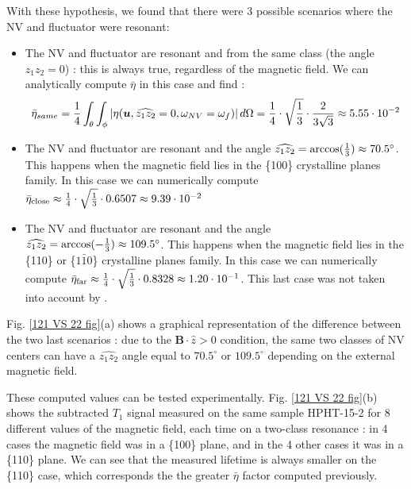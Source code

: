 \documentclass[preprintnumbers,amsmath,amssymb,onecolumn,12pt]{revtex4-2}\usepackage{graphicx}%
\begin{document}
With these hypothesis, we found that there were 3 possible scenarios where the NV and fluctuator were resonant:
\begin{itemize}
\item The NV and fluctuator are resonant and from the same class (the angle $\widehat{z_1 z_2}=0$) : this is always true, regardless of the magnetic field. We can analytically compute $\bar \eta$ in this case and find : $$ \bar {\eta}_{same}=\frac{1}{4}  \int_\theta \int_\phi \abs{\eta(\bm u,\widehat{z_1 z_2}=0,\omega_{NV}=\omega_f)}\, d\Omega= \frac{1}{4} \cdot \sqrt{\frac{1}{3}} \cdot \frac{2}{3 \sqrt{3}} \approx 5.55\cdot10^{-2}$$
\item The NV and fluctuator are resonant and the angle $\widehat{z_1 z_2}=\rm{arccos}(\frac{1}{3})\approx 70.5^\circ$. This happens when the magnetic field lies in the \{100\} crystalline planes family. In this case we can numerically compute $\bar \eta_{\rm close} \approx \frac{1}{4} \cdot \sqrt{\frac{1}{3}} \cdot 0.6507 \approx 9.39\cdot10^{-2}$
\item The NV and fluctuator are resonant and the angle $\widehat{z_1 z_2}=\rm{arccos}(-\frac{1}{3})\approx 109.5^\circ$. This happens when the magnetic field lies in the \{110\} or \{$1\bar{1}0$\} crystalline planes family. In this case we can numerically compute $\bar \eta_{\rm far} \approx \frac{1}{4} \cdot \sqrt{\frac{1}{3}} \cdot 0.8328 \approx 1.20\cdot10^{-1}$. This last case was not taken into account by \cite{choi_depolarization_2017}.
\end{itemize}



Fig. \ref{121 VS 22 fig}(a) shows a graphical representation of the difference between the two last scenarios : due to the $\bm{B}\cdot \hat{z} >0$ condition, the same two classes of NV centers can have a $\widehat{z_1 z_2}$ angle equal to $70.5^\circ$ or $109.5^\circ$ depending on the external magnetic field. 

These computed values can be tested experimentally. Fig. \ref{121 VS 22 fig}(b) shows the subtracted $T_1$ signal measured on the same sample HPHT-15-2 for 8 different values of the magnetic field, each time on a two-class resonance : in 4 cases the magnetic field was in a \{100\} plane, and in the 4 other cases it was in a \{110\} plane. We can see that the measured lifetime is always smaller on the \{110\} case, which corresponds the the greater $\bar \eta$ factor computed previously.
\end{document}

